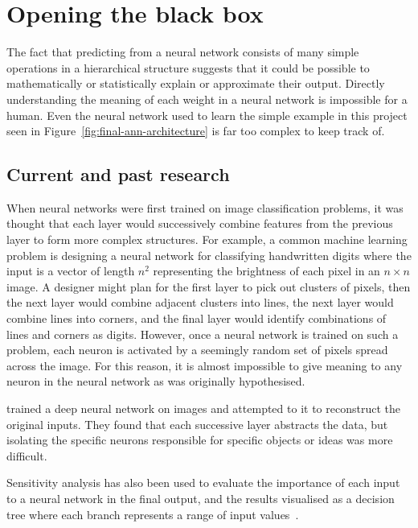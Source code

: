 
\chapter{Opening the black box}

The fact that predicting from a neural network consists of many simple operations in a hierarchical structure suggests that it could be possible to mathematically or statistically explain or approximate their output.
Directly understanding the meaning of each weight in a neural network is impossible for a human.
Even the neural network used to learn the simple example in this project seen in Figure~\ref{fig:final-ann-architecture} is far too complex to keep track of.

\section{Current and past research}

When neural networks were first trained on image classification problems, it was thought that each layer would successively combine features from the previous layer to form more complex structures.
For example, a common machine learning problem is designing a neural network for classifying handwritten digits where the input is a vector of length \(n^2\) representing the brightness of each pixel in an \(n \times n\) image.
A designer might plan for the first layer to pick out clusters of pixels, then the next layer would combine adjacent clusters into lines, the next layer would combine lines into corners, and the final layer would identify combinations of lines and corners as digits.
However, once a neural network is trained on such a problem, each neuron is activated by a seemingly random set of pixels spread across the image.
For this reason, it is almost impossible to give meaning to any neuron in the neural network as was originally hypothesised.

\textcite{mahendran2014} trained a deep neural network on images and attempted to  it to reconstruct the original inputs.
They found that each successive layer abstracts the data, but isolating the specific neurons responsible for specific objects or ideas was more difficult.

Sensitivity analysis has also been used to evaluate the importance of each input to a neural network in the final output, and the results visualised as a decision tree where each branch represents a range of input values~\autocite[13]{cortez2013}.

